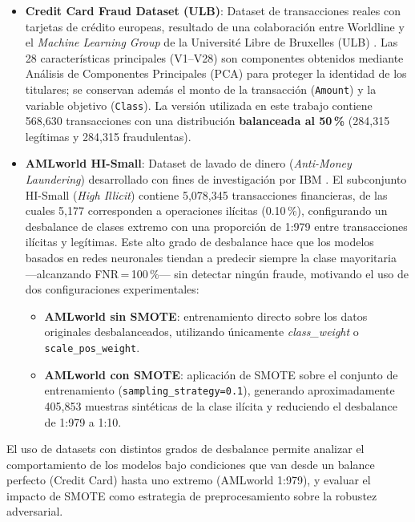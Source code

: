 \begin{itemize}
    \item \textbf{Credit Card Fraud Dataset (ULB)}: Dataset de transacciones reales con tarjetas de crédito europeas, resultado de una colaboración entre Worldline y el \textit{Machine Learning Group} de la Université Libre de Bruxelles (ULB) \cite{dal2015calibrating}. Las 28 características principales (V1--V28) son componentes obtenidos mediante Análisis de Componentes Principales (PCA) para proteger la identidad de los titulares; se conservan además el monto de la transacción (\texttt{Amount}) y la variable objetivo (\texttt{Class}). La versión utilizada en este trabajo contiene 568{,}630 transacciones con una distribución \textbf{balanceada al 50\,\%} (284{,}315 legítimas y 284{,}315 fraudulentas).

    \item \textbf{AMLworld HI-Small}: Dataset de lavado de dinero (\textit{Anti-Money Laundering}) desarrollado con fines de investigación por IBM \cite{altman2024realistic}. El subconjunto HI-Small (\textit{High Illicit}) contiene 5{,}078{,}345 transacciones financieras, de las cuales 5{,}177 corresponden a operaciones ilícitas (0.10\,\%), configurando un desbalance de clases extremo con una proporción de 1:979 entre transacciones ilícitas y legítimas. Este alto grado de desbalance hace que los modelos basados en redes neuronales tiendan a predecir siempre la clase mayoritaria —alcanzando FNR\,=\,100\,\%— sin detectar ningún fraude, motivando el uso de dos configuraciones experimentales:
    \begin{itemize}
        \item \textbf{AMLworld sin SMOTE}: entrenamiento directo sobre los datos originales desbalanceados, utilizando únicamente \textit{class\_weight} o \texttt{scale\_pos\_weight}.
        \item \textbf{AMLworld con SMOTE}: aplicación de SMOTE \cite{chawla2002smote} sobre el conjunto de entrenamiento (\texttt{sampling\_strategy=0.1}), generando aproximadamente 405{,}853 muestras sintéticas de la clase ilícita y reduciendo el desbalance de 1:979 a 1:10.
    \end{itemize}
\end{itemize}

El uso de datasets con distintos grados de desbalance permite analizar el comportamiento de los modelos bajo condiciones que van desde un balance perfecto (Credit Card) hasta uno extremo (AMLworld 1:979), y evaluar el impacto de SMOTE como estrategia de preprocesamiento sobre la robustez adversarial.

